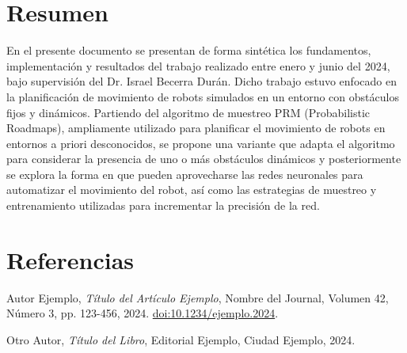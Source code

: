 \documentclass[spanish,mexico]{article}
\author{Luis Ramón Guajardo Maldonado}
\title{}
\date{\today}
\numberwithin{equation}{section}
\theoremstyle{definition}
\theoremstyle{remark}
\begin{document}
\fontsize{11pt}{14pt}\selectfont

\maketitle

\section{Resumen}
En el presente documento se presentan de forma sintética los fundamentos, implementación y resultados del trabajo realizado entre enero y junio del 2024, bajo supervisión del Dr. Israel Becerra Durán. Dicho trabajo estuvo enfocado en la planificación de movimiento de robots simulados en un entorno con obstáculos fijos y dinámicos. Partiendo del algoritmo de muestreo PRM (Probabilistic Roadmaps), ampliamente utilizado para planificar el movimiento de robots en entornos a priori desconocidos, se propone una variante que adapta el algoritmo para considerar la presencia de uno o más obstáculos dinámicos y posteriormente se explora la forma en que pueden aprovecharse las redes neuronales para automatizar el movimiento del robot, así como las estrategias de muestreo y entrenamiento utilizadas para incrementar la precisión de la red. \cite{ejemplo2024}



\newpage
\section{Referencias}
\begin{thebibliography}{9}
    Autor Ejemplo,
    \emph{Título del Artículo Ejemplo},
    Nombre del Journal, Volumen 42, Número 3, pp. 123-456, 2024.
    \href{https://doi.org/10.1234/ejemplo.2024}{doi:10.1234/ejemplo.2024}.

    Otro Autor,
    \emph{Título del Libro},
    Editorial Ejemplo, Ciudad Ejemplo, 2024.
\end{thebibliography}
\end{document}
